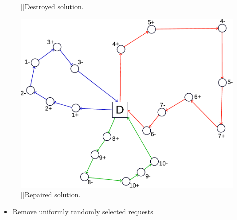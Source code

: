 \documentclass[aspectratio=1610]{beamer}
\let\oldfootnotesize\footnotesize
\renewcommand*{\footnotesize}{\oldfootnotesize\fontsize{6}{4}\selectfont}
\renewcommand{\footnotesize}{\scriptsize}
\begin{document}
\begin{frame}
\begin{minipage}[t]{.3\textwidth}
\begin{figure}
	[]{Destroyed solution.}
\end{figure}
\end{minipage}%
\hfill%
\begin{minipage}[t]{.3\textwidth}
\begin{figure}
	\centering
	\includegraphics[width=\textwidth]{graphics/lns-repair-solution-new} 
	[]{Repaired solution.}
\end{figure}
\end{minipage}%

\bigskip

\begin{itemize}
	\item Remove uniformly randomly selected requests 
\end{itemize}
\end{frame}
\end{document}
